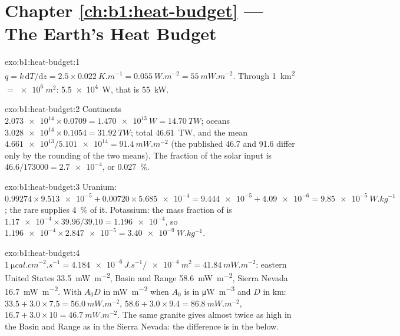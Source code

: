\section*{Chapter \ref{ch:b1:heat-budget} --- The Earth's Heat Budget}

\begin{solution}{exo:b1:heat-budget:1}
$q = k\,\mathrm dT/\mathrm dz = 2.5\times\qty{0.022}{K.m^{-1}} =
\qty{0.055}{W.m^{-2}} = \qty{55}{mW.m^{-2}}$. Through \qty{1}{km^2} $=
\qty{e6}{m^2}$: \qty{5.5e4}{W}, that is \qty{55}{kW}.
\end{solution}

\begin{solution}{exo:b1:heat-budget:2}
Continents $\num{2.073e14}\times0.0709 = \qty{1.470e13}{W} = \qty{14.70}{TW}$;
oceans $\num{3.028e14}\times0.1054 = \qty{31.92}{TW}$; total \qty{46.61}{TW}, and
the mean  $\num{4.661e13}/\num{5.101e14} = \qty{91.4}{mW.m^{-2}}$ (the
published 46.7 and 91.6 differ only by the rounding of the two means). The
fraction of the solar input is $46.6/173000 = \num{2.7e-4}$, or
\qty{0.027}{\percent}.
\end{solution}

\begin{solution}{exo:b1:heat-budget:3}
Uranium: $0.99274\times\num{9.513e-5} + 0.00720\times\num{5.685e-4} =
\num{9.444e-5} + \num{4.09e-6} = \qty{9.85e-5}{W.kg^{-1}}$; the rare
 supplies \qty{4}{\percent} of it. Potassium: the mass fraction of
 is $\num{1.17e-4}\times39.96/39.10 = \num{1.196e-4}$, so
$\num{1.196e-4}\times\num{2.847e-5} = \qty{3.40e-9}{W.kg^{-1}}$.
\end{solution}

\begin{solution}{exo:b1:heat-budget:4}
$\qty{1}{\micro cal.cm^{-2}.s^{-1}} = \num{4.184e-6}\,\unit{J.s^{-1}}/\qty{e-4}{m^2}
= \qty{41.84}{mW.m^{-2}}$: eastern United States \qty{33.5}{mW.m^{-2}}, Basin and
Range \qty{58.6}{mW.m^{-2}}, Sierra Nevada \qty{16.7}{mW.m^{-2}}. With $A_0D$ in
\unit{mW.m^{-2}} when $A_0$ is in \unit{\micro W.m^{-3}} and $D$ in \unit{km}:
$33.5 + 3.0\times7.5 = \qty{56.0}{mW.m^{-2}}$, $58.6 + 3.0\times9.4 =
\qty{86.8}{mW.m^{-2}}$, $16.7 + 3.0\times10 = \qty{46.7}{mW.m^{-2}}$. The same
granite gives  almost twice as high in the Basin and Range as in the
Sierra Nevada: the difference is in the  below.
\end{solution}

